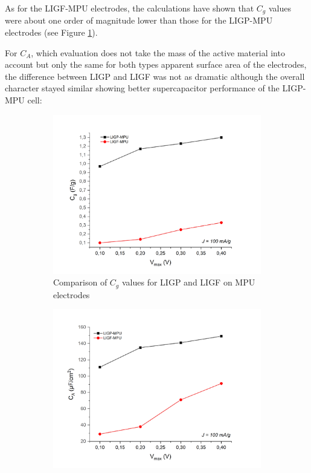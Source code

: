 As for the LIGF-MPU electrodes, the calculations have shown that $C_g$ values were about one order of magnitude lower than those for the LIGP-MPU electrodes (see Figure \ref{fig:LIGs-MPU-C-g}). 

For $C_A$, which evaluation does not take the mass of the active material into account but only the same for both types apparent surface area of the electrodes, the difference between LIGP and LIGF was not as dramatic although the overall character stayed similar showing better supercapacitor performance of the LIGP-MPU cell: 

\begin{figure}[H]
\begin{subfigure}{0.49\textwidth}
\includegraphics[width=1\textwidth]{Figures/Results/Electrochemistry/Comparisons/LIG-MPU-C_g.jpg} 
\captionsetup{width=0.9\linewidth}
\caption{Comparison of $C_g$ values for LIGP and LIGF on MPU electrodes}
\label{fig:LIGs-MPU-C-g}
\end{subfigure}
\begin{subfigure}{0.49\textwidth}
\includegraphics[width=1\textwidth]{Figures/Results/Electrochemistry/Comparisons/LIG-MPU-C_A.jpg}

\end{subfigure}
\end{figure}
